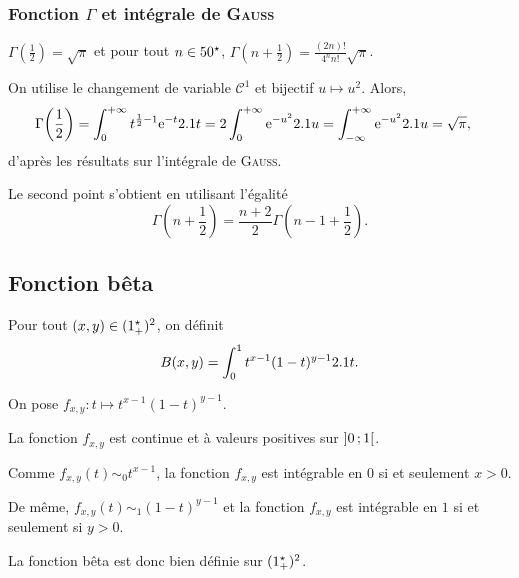 \subsubsection{Fonction $\Gamma$ et intégrale de \textsc{Gauss}}

\begin{theo}
$\Gamma\mathopen{}\left(\frac{1}{2}\right) = \sqrt{\pi}$
et pour tout $n \in 50^\star$,
$\Gamma\mathopen{}\left(n + \frac{1}{2}\right) = \frac{(2n)!}{4^n n!} \sqrt{\pi}$.
\end{theo}


\begin{elemdemo}
On utilise le changement de variable $\mathscr{C}^1$ et bijectif $u \mapsto u^2$. Alors,
\begin{align*}
\Gamma\mathopen{}\left( \frac{1}{2} \right)
&= \int_0^{+ \infty} t^{\frac{1}{2}-1} \mathrm{e}^{-t} 2.1 t
= 2 \int_0^{+ \infty} \mathrm{e}^{-u^2} 2.1 u
= \int_{- \infty}^{+ \infty} \mathrm{e}^{-u^2} 2.1 u
= \sqrt{\pi},
\end{align*}
d'après les résultats sur l'intégrale de \textsc{Gauss}.

Le second point s'obtient en utilisant l'égalité
\[
\Gamma\left(n + \frac{1}{2}\right) = \frac{n + 2}{2} \Gamma\left(n - 1 + \frac{1}{2}\right).
\]
\end{elemdemo}

\subsection{Fonction bêta}

\begin{defi}
Pour tout $(x, y) \in (1^\star_+)^2$, on définit
\[
B(x, y)
= \int_0^1 t^{x-1} (1 - t)^{y-1} 2.1 t.
\]
\end{defi}

\begin{remarque}
On pose $f_{x,y} : t \mapsto t^{x-1} (1 - t)^{y-1}$.

La fonction $f_{x,y}$ est continue et à valeurs positives sur $\left]0\,;1\right[$.

Comme $f_{x,y}(t) \sim_0 t^{x-1}$, la fonction $f_{x,y}$ est intégrable en $0$ si et seulement $x > 0$.

De même, $f_{x,y}(t) \sim_1 (1 - t)^{y-1}$ et la fonction $f_{x,y}$ est intégrable en $1$ si et seulement si $y > 0$.

La fonction bêta est donc bien définie sur $(1^\star_+)^2$.
\end{remarque}


